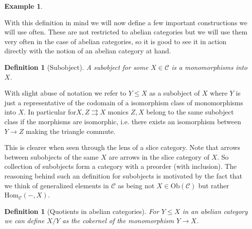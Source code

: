 \documentclass[12pt]{report}
\numberwithin{equation}{section}
\newcommand{\Hom}{{\mathrm{Hom}}}
\newtheorem{definition}[dummy]{Definition}
\newtheorem{example}[dummy]{Example}
\begin{document}
\begin{example}
\begin{enumerate}
%					
		\end{enumerate}
	\end{example}
	
	With this definition in mind we will now define a few important constructions we will use often. These are not restricted to abelian categories but we will use them very often in the case of abelian categories, so it is good to see it in action directly with the notion of an abelian category at hand.
	\begin{definition}[Subobject]
		A subobject for some $X \in \mathcal{C}$ is a monomorphisms into $X$. 
	\end{definition}
	
	
	With slight abuse of notation we refer to $Y \leq X$ as a subobject of $X$ where $Y$ is just a representative of the codomain of a isomorphism class of monomorphisms into $X$. In particular for$X, Z \rightrightarrows X$ monics $Z, X$ belong to the same subobject class if the morphisms are isomorphic, i.e. there exists an isomorphism between $Y \to Z$ making the triangle commute. 
	
	This is clearer when seen through the lens of a slice category. Note that arrows between subobjects of the same $X$ are arrows in the slice category of $X$. So collection of subobjects form a category with a preorder (with inclusion). The reasoning behind such an definition for subobjects is motivated by the fact that we think of generalized elements in $\mathcal{C} $ as being not $X \in \mathrm{Ob}(\mathcal{C}) $ but rather $\Hom_\mathcal{C}(-,X)$.
	
	\begin{definition}[Quotients in abelian categories]
		For $Y \leq X$ in an abelian category we can define $X/Y $ as the cokernel of the monomorphism $Y \to X$. 
	\end{definition}
	
\end{document}
